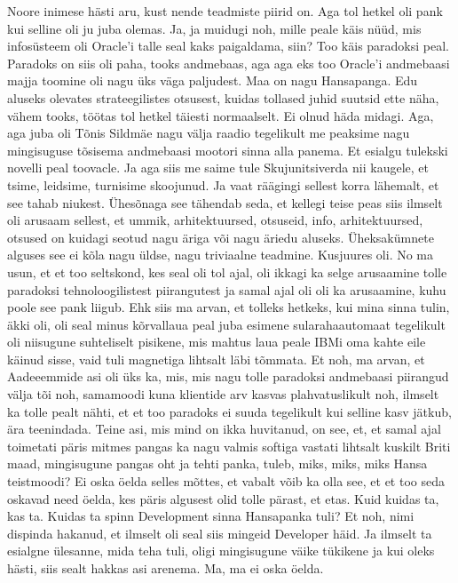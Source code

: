 Noore inimese hästi aru, kust nende teadmiste piirid on. Aga tol hetkel oli pank kui selline oli ju juba olemas. Ja, ja muidugi noh, mille peale käis nüüd, mis infosüsteem oli Oracle'i talle seal kaks paigaldama, siin?
Too käis paradoksi peal. Paradoks on siis oli paha, tooks andmebaas, aga aga eks too Oracle'i andmebaasi majja toomine oli nagu üks väga paljudest. Maa on nagu Hansapanga. Edu aluseks olevates strateegilistes otsusest, kuidas tollased juhid suutsid ette näha, vähem tooks, töötas tol hetkel täiesti normaalselt. Ei olnud häda midagi. Aga, aga juba oli Tõnis Sildmäe nagu välja raadio tegelikult me peaksime nagu mingisuguse tõsisema andmebaasi mootori sinna alla panema. Et esialgu tulekski novelli peal toovacle. Ja aga siis me saime tule Skujunitsiverda nii kaugele, et tsime, leidsime, turnisime skoojunud.
Ja vaat räägingi sellest korra lähemalt, et see tahab niukest. Ühesõnaga see tähendab seda, et kellegi teise peas siis ilmselt oli arusaam sellest, et ummik, arhitektuursed, otsuseid, info, arhitektuursed, otsused on kuidagi seotud nagu äriga või nagu äriedu aluseks. Üheksakümnete alguses see ei kõla nagu üldse, nagu triviaalne teadmine. Kusjuures oli.
No ma usun, et et too seltskond, kes seal oli tol ajal, oli ikkagi ka selge arusaamine tolle paradoksi tehnoloogilistest piirangutest ja samal ajal oli oli ka arusaamine, kuhu poole see pank liigub. Ehk siis ma arvan, et tolleks hetkeks, kui mina sinna tulin, äkki oli, oli seal minus kõrvallaua peal juba esimene sularahaautomaat tegelikult oli niisugune suhteliselt pisikene, mis mahtus laua peale IBMi oma kahte eile käinud sisse, vaid tuli magnetiga lihtsalt läbi tõmmata. Et noh, ma arvan, et Aadeeemmide asi oli üks ka, mis, mis nagu tolle paradoksi andmebaasi piirangud välja tõi noh, samamoodi kuna klientide arv kasvas plahvatuslikult noh, ilmselt ka tolle pealt nähti, et et too paradoks ei suuda tegelikult kui selline kasv jätkub, ära teenindada.
Teine asi, mis mind on ikka huvitanud, on see, et, et samal ajal toimetati päris mitmes pangas ka nagu valmis softiga vastati lihtsalt kuskilt Briti maad, mingisugune pangas oht ja tehti panka, tuleb, miks, miks, miks Hansa teistmoodi?
Ei oska öelda selles mõttes, et vabalt võib ka olla see, et et too seda oskavad need öelda, kes päris algusest olid tolle pärast, et etas. Kuid kuidas ta, kas ta.
Kuidas ta spinn Development sinna Hansapanka tuli? Et noh, nimi dispinda hakanud, et ilmselt oli seal siis mingeid Developer häid. Ja ilmselt ta esialgne ülesanne, mida teha tuli, oligi mingisugune väike tükikene ja kui oleks hästi, siis sealt hakkas asi arenema. Ma, ma ei oska öelda.
